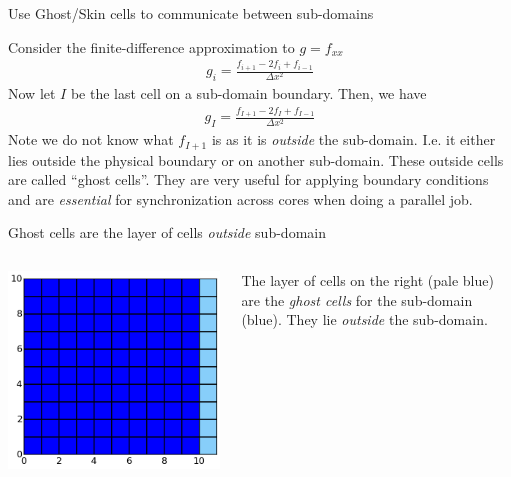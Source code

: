 \documentclass[aspectratio=169]{beamer}
\begin{document}
\begin{frame}{Use Ghost/Skin cells to communicate between sub-domains}

  Consider the finite-difference approximation to $g=f_{xx}$
  \begin{align*}
    g_i = \frac{f_{i+1}-2 f_{i}+f_{i-1}}{\Delta x^2}
  \end{align*}
  Now let $I$ be the last cell on a sub-domain boundary. Then, we have
  \begin{align*}
    g_I = \frac{f_{I+1}-2 f_{I}+f_{I-1}}{\Delta x^2}
  \end{align*}
  Note we do not know what $f_{I+1}$ is as it is \emph{outside} the
  sub-domain. I.e. it either lies outside the physical boundary or on
  another sub-domain.%
  \vskip0.1in%
  These outside cells are called ``ghost cells''. They are very useful
  for applying boundary conditions and are \emph{essential} for
  synchronization across cores when doing a parallel job.

\end{frame}

\begin{frame}{Ghost cells are the layer of cells \emph{outside}
    sub-domain}

  \begin{columns}
    
    \begin{column}{0.6\linewidth}
      \includegraphics[width=0.9\linewidth]{ghost-cells.png}
    \end{column}
    
    \begin{column}{0.4\linewidth}
      The layer of cells on the right (pale blue) are the \emph{ghost
        cells} for the sub-domain (blue). They lie \emph{outside} the
      sub-domain.
    \end{column}
  \end{columns}

\end{frame}
\end{document}
